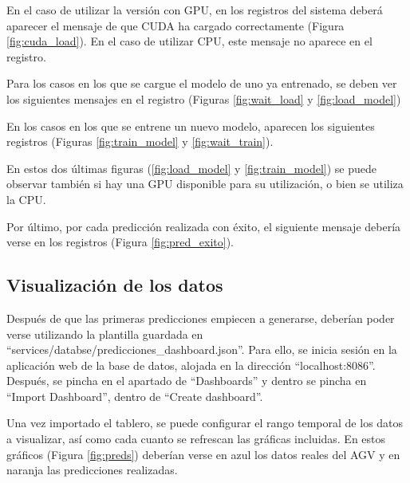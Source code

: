 
En el caso de utilizar la versión con GPU, en los registros del sistema deberá aparecer el mensaje de que CUDA ha 
cargado correctamente (Figura \ref{fig:cuda_load}). En el caso de utilizar CPU, este mensaje no aparece en el 
registro.


Para los casos en los que se cargue el modelo de uno ya entrenado, se deben ver los siguientes mensajes en el registro 
(Figuras \ref{fig:wait_load} y \ref{fig:load_model})


En los casos en los que se entrene un nuevo modelo, aparecen los siguientes registros (Figuras \ref{fig:train_model} y \ref{fig:wait_train}).


En estos dos últimas figuras (\ref{fig:load_model} y \ref{fig:train_model}) se puede observar también si hay 
una GPU disponible para su utilización, o bien se utiliza la CPU.

Por último, por cada predicción realizada con éxito, el siguiente mensaje debería verse en los registros (Figura \ref{fig:pred_exito}).


\subsection{Visualización de los datos}

Después de que las primeras predicciones empiecen a generarse, deberían poder verse utilizando la plantilla guardada en
``services/databse/predicciones\_dashboard.json''. Para ello, se inicia sesión en la aplicación web de la base de 
datos, alojada en la dirección ``localhost:8086''. Después, se pincha en el apartado de ``Dashboards'' y dentro se 
pincha en ``Import Dashboard'', dentro de ``Create dashboard''.

Una vez importado el tablero, se puede configurar el rango temporal de los datos a visualizar, así como cada cuanto 
se refrescan las gráficas incluidas. En estos gráficos (Figura \ref{fig:preds}) deberían verse en azul los datos reales 
del AGV y en naranja las predicciones realizadas.

